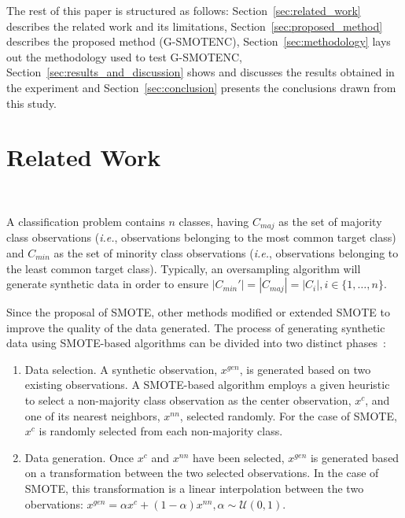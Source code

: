 \documentclass[preprint,12pt]{elsarticle}
\begin{document}
{%
The rest of this paper is structured as follows:
Section~\ref{sec:related_work} describes the related work and its limitations,
Section~\ref{sec:proposed_method} describes the proposed
method (G-SMOTENC), Section~\ref{sec:methodology} lays out the methodology
used to test G-SMOTENC, Section~\ref{sec:results_and_discussion} shows and
discusses the results obtained in the experiment and
Section~\ref{sec:conclusion} presents the conclusions drawn from this study.


\section{Related Work}~\label{sec:related_work}

A classification problem contains $n$ classes, having $C_{maj}$ as the set of
majority class observations (\textit{i.e.}, observations belonging to the most
common target class) and $C_{min}$ as the set of minority class observations
(\textit{i.e.}, observations belonging to the least common target class).
Typically, an oversampling algorithm will generate synthetic data in order to
ensure $|C_{min}'|=|C_{maj}|=|C_i|, i \in \{1, \ldots, n\}$.

Since the proposal of SMOTE, other methods modified or extended SMOTE to
improve the quality of the data generated. The process of generating synthetic
data using SMOTE-based algorithms can be divided into two distinct
phases~\cite{fernandez2018smote}:

\begin{enumerate}
    \item Data selection. A synthetic observation, $x^{gen}$, is generated
        based on two existing observations. A SMOTE-based algorithm employs a
        given heuristic to select a non-majority class observation as the
        center observation, $x^c$, and one of its nearest neighbors, $x^{nn}$,
        selected randomly. For the case of SMOTE, $x^c$ is randomly selected
        from each non-majority class.
    \item Data generation. Once $x^c$ and $x^{nn}$ have been selected, $x^{gen}$
        is generated based on a transformation between the two selected
        observations. In the case of SMOTE, this transformation is 
        a linear interpolation between the two obervations: $x^{gen} = \alpha x^c
        + (1-\alpha) x^{nn}, \alpha \sim \mathcal{U}(0, 1)$.
\end{enumerate}

}
\end{document}
